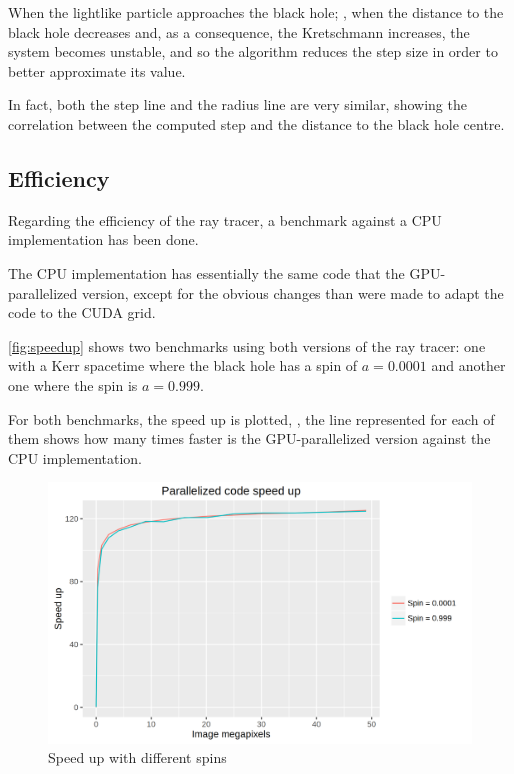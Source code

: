 When the lightlike particle approaches the black hole; \ie, when the distance to the black hole decreases and, as a consequence, the Kretschmann increases, the system becomes unstable, and so the algorithm reduces the step size in order to better approximate its value.

In fact, both the step line and the radius line are very similar, showing the correlation between the computed step and the distance to the black hole centre.

\subsection{Efficiency}

Regarding the efficiency of the ray tracer, a benchmark against a \ac{CPU} implementation has been done.

The \ac{CPU} implementation has essentially the same code that the \ac{GPU}-parallelized version, except for the obvious changes than were made to adapt the code to the \ac{CUDA} grid.

\autoref{fig:speedup} shows two benchmarks using both versions of the ray tracer: one with a Kerr spacetime where the black hole has a spin of $a = 0.0001$ and another one where the spin is $a = 0.999$.

For both benchmarks, the speed up is plotted, \ie, the line represented for each of them shows how many times faster is the \ac{GPU}-parallelized version against the \ac{CPU} implementation.

\begin{figure}[bth]
	\myfloatalign
	\includegraphics[width=1.2\linewidth]{gfx/speedup}
	\caption[Speed up with different spins]{Speed up with different spins}
	\label{fig:speedup}
\end{figure}

